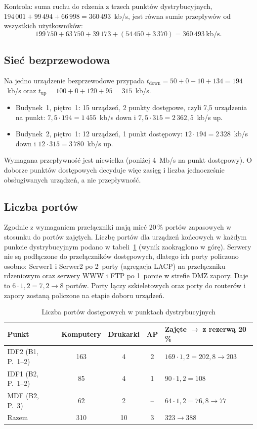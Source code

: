 \documentclass[12pt,a4paper]{article}
\begin{document}
Kontrola: suma ruchu do rdzenia z trzech punktów dystrybucyjnych,
$194\,001 + 99\,494 + 66\,998 = 360\,493$~kb/s, jest równa sumie przepływów
od wszystkich użytkowników:
\[ 199\,750 + 63\,750 + 39\,173 + (54\,450 + 3\,370) = 360\,493~\text{kb/s}. \]

\subsection{Sieć bezprzewodowa}

Na jedno urządzenie bezprzewodowe przypada
$t_\text{down} = 50 + 0 + 10 + 134 = 194$~kb/s oraz
$t_\text{up} = 100 + 0 + 120 + 95 = 315$~kb/s.
\begin{itemize}
  \item Budynek~1, piętro~1: 15 urządzeń, 2 punkty dostępowe, czyli 7,5
  urządzenia na punkt: $7{,}5\cdot194 = 1\,455$~kb/s down
  i $7{,}5\cdot315 = 2\,362{,}5$~kb/s up.
  \item Budynek~2, piętro~1: 12 urządzeń, 1 punkt dostępowy:
  $12\cdot194 = 2\,328$~kb/s down i $12\cdot315 = 3\,780$~kb/s up.
\end{itemize}
Wymagana przepływność jest niewielka (poniżej 4~Mb/s na punkt dostępowy).
O doborze punktów dostępowych decyduje więc zasięg i liczba jednocześnie
obsługiwanych urządzeń, a nie przepływność.

\subsection{Liczba portów}

Zgodnie z wymaganiem przełączniki mają mieć 20\,\% portów zapasowych
w stosunku do portów zajętych. Liczbę portów dla urządzeń końcowych
w każdym punkcie dystrybucyjnym podano w tabeli~\ref{tab:porty} (wynik
zaokrąglono w górę). Serwery nie są podłączone do przełączników dostępowych,
dlatego ich porty policzono osobno: Serwer1 i Serwer2 po 2~porty (agregacja
LACP) na przełączniku rdzeniowym oraz serwery WWW i FTP po 1~porcie w strefie
DMZ zapory. Daje to $6\cdot1{,}2 = 7{,}2 \to 8$ portów. Porty łączy
szkieletowych oraz porty do routerów i zapory zostaną policzone na etapie
doboru urządzeń.

\begin{table}[htbp]
\centering
\caption{Liczba portów dostępowych w punktach dystrybucyjnych}
\label{tab:porty}
\small
\begin{tabular}{lcccl}
\toprule
Punkt & Komputery & Drukarki & AP & Zajęte $\to$ z rezerwą 20\,\% \\
\midrule
IDF2 (B1, P.~1--2) & 163 & 4 & 2  & $169 \cdot 1{,}2 = 202{,}8 \to 203$ \\
IDF1 (B2, P.~1--2) &  85 & 4 & 1  & $90 \cdot 1{,}2 = 108$ \\
MDF  (B2, P.~3)    &  62 & 2 & -- & $64 \cdot 1{,}2 = 76{,}8 \to 77$ \\
\midrule
Razem              & 310 & 10 & 3 & $323 \to 388$ \\
\bottomrule
\end{tabular}
\end{table}
\end{document}
